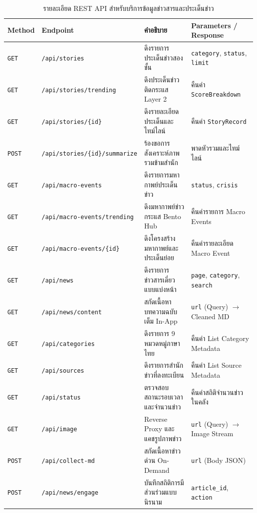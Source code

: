 \begin{table}[H]
\centering
\footnotesize
\caption{รายละเอียด REST API สำหรับบริการข้อมูลข่าวสารและประเด็นข่าว}
\label{tab:api_specs_news}
\begin{tabular}{|>{\centering\arraybackslash}p{1.1cm}|p{3.5cm}|p{4.4cm}|p{3.5cm}|}
\hline
\textbf{Method} & \textbf{Endpoint} & \textbf{คำอธิบาย} & \textbf{Parameters / Response} \\
\hline
\texttt{GET} & \texttt{/api/stories} & ดึงรายการประเด็นข่าวสองชั้น & \texttt{category}, \texttt{status}, \texttt{limit} \\ \hline
\texttt{GET} & \texttt{/api/stories/trending} & ดึงประเด็นข่าวติดกระแส Layer 2 & คืนค่า \texttt{ScoreBreakdown} \\ \hline
\texttt{GET} & \texttt{/api/stories/\{id\}} & ดึงรายละเอียดประเด็นและไทม์ไลน์ & คืนค่า \texttt{StoryRecord} \\ \hline
\texttt{POST} & \texttt{/api/stories/\{id\}/summarize} & ร้องขอการสังเคราะห์ภาพรวมข้ามสำนัก & พาดหัวรวมและไทม์ไลน์ \\ \hline
\texttt{GET} & \texttt{/api/macro-events} & ดึงรายการมหากาพย์ประเด็นข่าว & \texttt{status}, \texttt{crisis} \\ \hline
\texttt{GET} & \texttt{/api/macro-events/trending} & ดึงมหากาพย์ข่าวกระแส Bento Hub & คืนค่ารายการ Macro Events \\ \hline
\texttt{GET} & \texttt{/api/macro-events/\{id\}} & ดึงโครงสร้างมหากาพย์และประเด็นย่อย & คืนค่ารายละเอียด Macro Event \\ \hline
\texttt{GET} & \texttt{/api/news} & ดึงรายการข่าวสารเดี่ยวแบบแบ่งหน้า & \texttt{page}, \texttt{category}, \texttt{search} \\ \hline
\texttt{GET} & \texttt{/api/news/content} & สกัดเนื้อหาบทความฉบับเต็ม In-App & \texttt{url} (Query) $\rightarrow$ Cleaned MD \\ \hline
\texttt{GET} & \texttt{/api/categories} & ดึงรายการ 9 หมวดหมู่ภาษาไทย & คืนค่า List Category Metadata \\ \hline
\texttt{GET} & \texttt{/api/sources} & ดึงรายการสำนักข่าวที่ลงทะเบียน & คืนค่า List Source Metadata \\ \hline
\texttt{GET} & \texttt{/api/status} & ตรวจสอบสถานะรอบเวลาและจำนวนข่าว & คืนค่าสถิติจำนวนข่าวในคลัง \\ \hline
\texttt{GET} & \texttt{/api/image} & Reverse Proxy และแคชรูปภาพข่าว & \texttt{url} (Query) $\rightarrow$ Image Stream \\ \hline
\texttt{POST} & \texttt{/api/collect-md} & สกัดเนื้อหาข่าวด่วน On-Demand & \texttt{url} (Body JSON) \\ \hline
\texttt{POST} & \texttt{/api/news/engage} & บันทึกสถิติการมีส่วนร่วมแบบนิรนาม & \texttt{article\_id}, \texttt{action} \\
\hline
\end{tabular}
\end{table}


